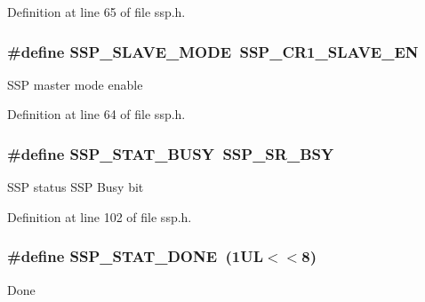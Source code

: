 Definition at line 65 of file ssp.\+h.

\subsubsection[{\texorpdfstring{S\+S\+P\+\_\+\+S\+L\+A\+V\+E\+\_\+\+M\+O\+DE}{SSP_SLAVE_MODE}}]{\setlength{\rightskip}{0pt plus 5cm}\#define S\+S\+P\+\_\+\+S\+L\+A\+V\+E\+\_\+\+M\+O\+DE~{\bf S\+S\+P\+\_\+\+C\+R1\+\_\+\+S\+L\+A\+V\+E\+\_\+\+EN}}\hypertarget{group___s_s_p___public___macros_gac6bc4b92810caa934b2d7116390098c6}{}\label{group___s_s_p___public___macros_gac6bc4b92810caa934b2d7116390098c6}
S\+SP master mode enable 

Definition at line 64 of file ssp.\+h.

\subsubsection[{\texorpdfstring{S\+S\+P\+\_\+\+S\+T\+A\+T\+\_\+\+B\+U\+SY}{SSP_STAT_BUSY}}]{\setlength{\rightskip}{0pt plus 5cm}\#define S\+S\+P\+\_\+\+S\+T\+A\+T\+\_\+\+B\+U\+SY~{\bf S\+S\+P\+\_\+\+S\+R\+\_\+\+B\+SY}}\hypertarget{group___s_s_p___public___macros_ga618e52f34a11a7e9414d18a2e56be63c}{}\label{group___s_s_p___public___macros_ga618e52f34a11a7e9414d18a2e56be63c}
S\+SP status S\+SP Busy bit 

Definition at line 102 of file ssp.\+h.

\subsubsection[{\texorpdfstring{S\+S\+P\+\_\+\+S\+T\+A\+T\+\_\+\+D\+O\+NE}{SSP_STAT_DONE}}]{\setlength{\rightskip}{0pt plus 5cm}\#define S\+S\+P\+\_\+\+S\+T\+A\+T\+\_\+\+D\+O\+NE~(1\+U\+L$<$$<$8)}\hypertarget{group___s_s_p___public___macros_ga50dbb53cd4d651137a9826f1cee0156b}{}\label{group___s_s_p___public___macros_ga50dbb53cd4d651137a9826f1cee0156b}
Done 

